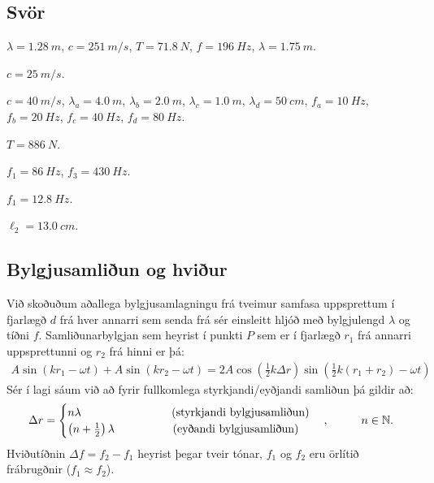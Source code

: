 \subsection*{Svör}

\begin{enumerate*}[label = \vspace{0.15cm} \textbf{(\arabic*)}]
    \setcounter{enumi}{28}
  \item $\lambda = \SI{1.28}{m}$, $c = \SI{251}{m/s}$, $T = \SI{71.8}{N}$, $f = \SI{196}{Hz} $, $\lambda = \SI{1.75}{m}$.
  \item $c = \SI{25}{m/s}$.
  \item $c = \SI{40}{m/s}$, $\lambda_a = \SI{4.0}{m}$, $\lambda_b = \SI{2.0}{m}$, $\lambda_c = \SI{1.0}{m}$, $\lambda_d = \SI{50}{cm}$, $f_a = \SI{10}{Hz}$, $f_b = \SI{20}{Hz}$, $f_c = \SI{40}{Hz}$, $f_d = \SI{80}{Hz}$.
  \item $T = \SI{886}{N}$.
  \item $f_1 = \SI{86}{Hz}$, $f_3 = \SI{430}{Hz}$.
  \item $f_1 = \SI{12.8}{Hz}$.
  \item $\ell_2 = \SI{13.0}{cm}$.
\end{enumerate*}

\newpage


\subsection*{Bylgjusamliðun og hviður}

\begin{tcolorbox}
Við skoðuðum aðallega bylgjusamlagningu frá tveimur samfasa uppsprettum í fjarlægð $d$ frá hver annarri sem senda frá sér einsleitt hljóð með bylgjulengd $\lambda$ og tíðni $f$. Samliðunarbylgjan sem heyrist í punkti $P$ sem er í fjarlægð $r_1$ frá annarri uppsprettunni og $r_2$ frá hinni er þá:
\begin{align*}
    A\sin(kr_1-\omega t) + A\sin(kr_2 - \omega t) = 2A\cos(\frac{1}{2}k\Delta r)\sin(\frac{1}{2}k(r_1+r_2)-\omega t)
\end{align*}
Sér í lagi sáum við að fyrir fullkomlega styrkjandi/eyðjandi samliðun þá gildir að:
\begin{align*}
    \Delta r = \begin{cases}
    n \lambda \hspace{2.8cm} \text{(styrkjandi bylgjusamliðun)} \\
    \left(n+\frac{1}{2}\right)\lambda \hspace{1.8cm} \text{(eyðandi bylgjusamliðun)}
    \end{cases},\hspace{1cm} n \in \mathbb{N}.
\end{align*}
Hviðutíðnin $\Delta f = f_2 - f_1$ heyrist þegar tveir tónar, $f_1$ og $f_2$ eru örlítið frábrugðnir ($f_1 \approx f_2$).
\end{tcolorbox}

